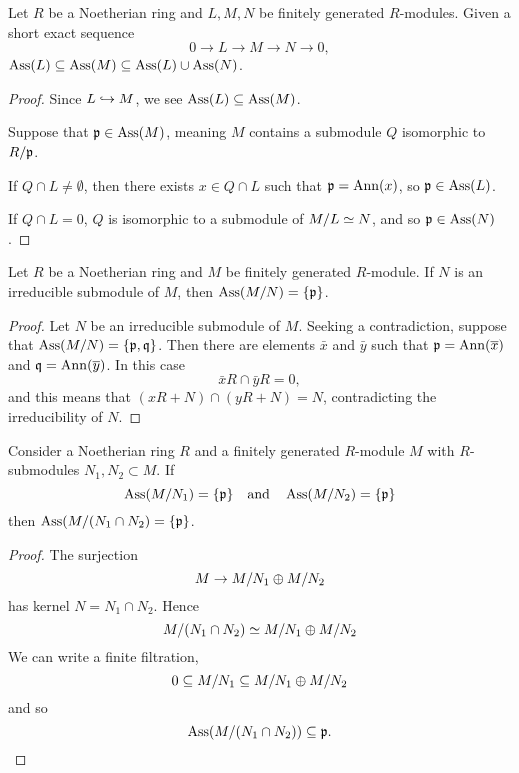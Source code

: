 \documentclass{ximera}
\begin{document}
\begin{proposition}
  Let $R$ be a Noetherian ring and $L,M,N$ be finitely generated
  $R$-modules. Given a short exact sequence
  \[
  0 \to L \to M \to N \to 0,
  \]
  $\operatorname{Ass}(L) \subseteq \operatorname{Ass}(M) \subseteq \operatorname{Ass}(L) \cup \operatorname{Ass}(N)$.
  \begin{proof}
    Since $L\hookrightarrow M$, we see $\operatorname{Ass}(L) \subseteq \operatorname{Ass}(M)$.

    Suppose that $\mathfrak{p}\in\operatorname{Ass}(M)$, meaning $M$ contains a submodule $Q$
    isomorphic to $R/\mathfrak{p}$.

    If $Q\cap L \ne \emptyset$, then there exists $x\in Q\cap L$ such
    that $\mathfrak{p} = \operatorname{Ann}(x)$, so $\mathfrak{p}\in\operatorname{Ass}(L)$.

    If $Q\cap L = 0$, $Q$ is isomorphic to a submodule of $M/L\simeq N$,
    and so $\mathfrak{p}\in\operatorname{Ass}(N)$.
  \end{proof}
\end{proposition}







\begin{lemma}\label{L:irrassassin}
  Let $R$ be a Noetherian ring and $M$ be finitely generated
  $R$-module. If $N$ is an irreducible submodule of $M$, then
  $\operatorname{Ass}(M/N)=\{\mathfrak{p}\}$.
  \begin{proof}
    Let $N$ be an irreducible submodule of $M$. Seeking a
    contradiction, suppose that $\operatorname{Ass}(M/N) = \{\mathfrak{p},\mathfrak{q}\}$. Then there
    are elements $\bar{x}$ and $\bar{y}$ such that $\mathfrak{p}=\operatorname{Ann}(\overline{x})$
    and $\mathfrak{q}=\operatorname{Ann}(\overline{y})$. In this case
    \[
    \bar{x}R \cap \bar{y}R = 0,
    \]
    and this means that $(xR +N)\cap(yR+N) = N$, contradicting the
    irreducibility of $N$.
  \end{proof}
\end{lemma}


\begin{lemma}\label{L:intersectassassin}
  Consider a Noetherian ring $R$ and a finitely generated $R$-module
  $M$ with $R$-submodules $N_1,N_2\subset M$. If
  \[
  \operatorname{Ass}(M/N_1) = \{\mathfrak{p}\} \quad\text{and}\quad \operatorname{Ass}(M/N_2) = \{\mathfrak{p}\}
  \]
  then $\operatorname{Ass}(M/(N_1\cap N_2) = \{\mathfrak{p}\}$.
  \begin{proof}
    The surjection
    \[
    M \to M/N_1\oplus M/N_2
    \]
    has kernel $N = N_1\cap N_2$. Hence
    \[
    M/(N_1\cap N_2)\simeq M/N_1\oplus M/N_2
    \]
    We can write a finite filtration,
    \[
    0 \subseteq M/N_1 \subseteq M/N_1\oplus M/N_2
    \]
    and so
    \[
    \operatorname{Ass}(M/(N_1\cap N_2)) \subseteq{\mathfrak{p}}. 
    \]
  \end{proof}
\end{lemma}
\end{document}
